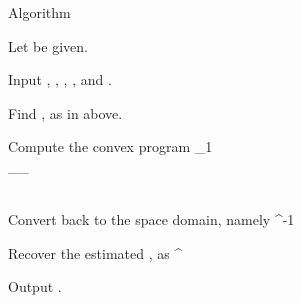 \Result
{Algorithm}
{
\startitemize[n]
%
\item Let  be given.
%
\item Input ,
,
,
,
and .
%
\item Find ,  as in above.
%
\item Compute the convex program
%
 {
\leftarrow \startcases
{}  \MC {} _1 \\
%
 \;  \quad \MC {} _\infty \leq \g_{} \\
\stopcases \\
}
%
\item Convert  back to the space domain, namely
%
 {
\leftarrow {}^{-1}  \\
}
%
\item Recover the estimated , as
%
 {
\leftarrow {}  ^\dagger \\
}
%
\item Output .
%
\stopitemize
}



